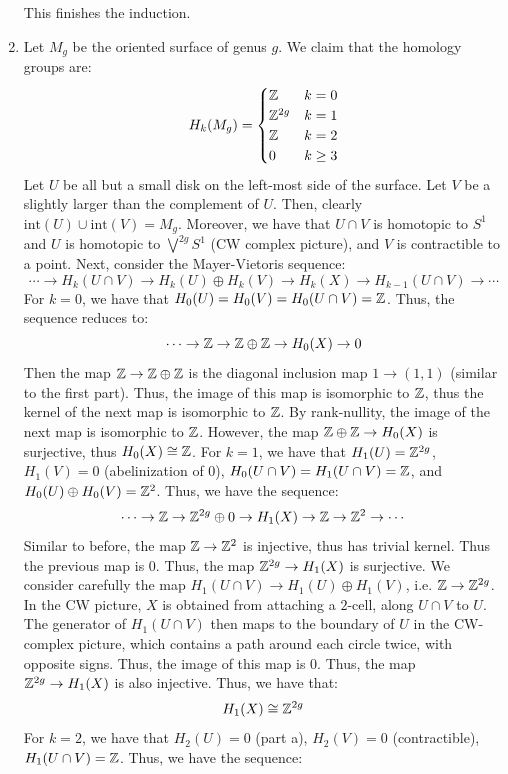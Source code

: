 \documentclass[12pt]{article}
\begin{document}
\begin{solution}
\begin{enumerate}
        This finishes the induction. 
        \item Let $M_g$ be the oriented surface of genus $g$. We claim that the homology groups are: 
        \[ H_k(M_g) = \begin{cases} \mathbb Z & k = 0 \\ \mathbb Z^{2g} & k = 1 \\ \mathbb Z & k = 2 \\ 0 & k \geq 3 \end{cases} \]
        Let $U$ be all but a small disk on the left-most side of the surface. Let $V$ be a slightly larger than the complement of $U$. Then, clearly $\text{int}(U) \cup \text{int}(V) = M_g$. Moreover, we have that $U \cap V$ is homotopic to $S^1$ and $U$ is homotopic to $\bigvee^{2g} S^1$ (CW complex picture), and $V$ is contractible to a point. Next, consider the Mayer-Vietoris sequence:
        \[ \cdots \to H_k(U \cap V) \to H_k(U) \oplus H_k(V) \to H_k(X) \to H_{k-1}(U \cap V)  \to \cdots\]
        For $k = 0$, we have that $H_0(U) = H_0(V) = H_0(U \cap V) = \mathbb Z$. Thus, the sequence reduces to: 
        \[ \cdots \to \mathbb Z \to \mathbb Z \oplus \mathbb Z \to H_0(X) \to 0 \]
        Then the map $\mathbb Z \to \mathbb Z \oplus \mathbb Z$ is the diagonal inclusion map $1 \to (1, 1)$ (similar to the first part). Thus, the image of this map is isomorphic to $\mathbb Z$, thus the kernel of the next map is isomorphic to $\mathbb Z$. By rank-nullity, the image of the next map is isomorphic to $\mathbb Z$. However, the map $\mathbb Z \oplus \mathbb Z \to H_0(X)$ is surjective, thus $H_0(X) \cong \mathbb Z$. \bbni
        For $k = 1$, we have that $H_1(U) = \mathbb Z^{2g}$, $H_1(V) = 0$ (abelinization of $0$), $H_0(U \cap V) = H_1(U \cap V) = \mathbb Z$, and $H_0(U) \oplus H_0(V) = \mathbb Z^2$. Thus, we have the sequence:
        \[ \cdots \to \mathbb Z \to \mathbb Z^{2g} \oplus 0 \to H_1(X) \to \mathbb Z  \to \mathbb Z^2  \to \cdots\]    
        Similar to before, the map $\mathbb Z \to \mathbb Z^2$ is injective, thus has trivial kernel. Thus the previous map is $0$. Thus, the map $\mathbb Z^{2g} \to H_1(X)$ is surjective. \bbni
        We consider carefully the map $H_1(U \cap V) \to H_1(U) \oplus H_1(V)$, i.e. $\mathbb Z \to \mathbb Z^{2g}$. In the CW picture, $X$ is obtained from attaching a $2$-cell, along $U \cap V$ to $U$. The generator of $H_1(U \cap V)$ then maps to the boundary of $U$ in the CW-complex picture, which contains a path around each circle twice, with opposite signs. Thus, the image of this map is $0$. Thus, the map $\mathbb Z^{2g} \to H_1(X)$ is also injective. Thus, we have that:
        \[ H_1(X) \cong \mathbb Z^{2g}\]
        For $k = 2$, we have that $H_2(U) = 0$ (part a), $H_2(V) = 0$ (contractible), $H_1(U \cap V) = \mathbb Z$. Thus, we have the sequence:

\end{enumerate}
\end{solution}
\end{document}
